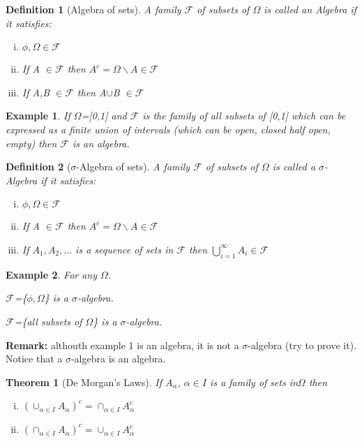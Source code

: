 \documentclass[12pt]{article}
\newtheorem{theorem}{Theorem}
\newtheorem{definition}{Definition}
\newtheorem{example}{Example}
\begin{document}
\begin{definition}[Algebra of sets] A family $\mathcal{F}$ of subsets of $\Omega$ is called an Algebra if it satisfies:
\begin{enumerate}[(i)]
  \item $\phi, \Omega \in \mathcal{F}$
  \item If A $\in \mathcal{F}$ then $A^{c}= \Omega \backslash A \in \mathcal{F}$
  \item If A,B $\in \mathcal{F}$ then A$\cup$B $\in \mathcal{F}$
\end{enumerate}
 \end{definition}

\begin{example} If $\Omega$=[0,1] and $\mathcal{F}$ is the family of all subsets of [0,1] which can be expressed as a finite union of intervals (which can be open, closed half open, empty) then $\mathcal{F}$ is an algebra. \end{example}

\begin{definition}[$\sigma$-Algebra of sets] A family $\mathcal{F}$ of subsets of $\Omega$ is called a $\sigma$-Algebra if it satisfies:
\begin{enumerate}[(i)]
  \item $\phi, \Omega \in \mathcal{F}$
  \item If A $\in \mathcal{F}$ then $A^{c}= \Omega \backslash A \in \mathcal{F}$
  \item If $A_1,A_2,\dots$ is a sequence of sets in $\mathcal{F}$ then $\bigcup_{i=1}^{\infty} A_{i} \in \mathcal{F}$
\end{enumerate}
 \end{definition}

\begin{example}
For any $\Omega$.
\item $\mathcal{F}$=\{$\phi,\Omega$\} is a $\sigma$-algebra.
\item $\mathcal{F}$=\{all subsets of $\Omega$\} is a $\sigma$-algebra.
\end{example}

{\bf Remark:} althouth example 1 is an algebra, it is not a $\sigma$-algebra (try to prove it). Notice that a $\sigma$-algebra is an algebra.
\vspace{20pt}
\begin{theorem}[De Morgan's Laws] If $A_{\alpha}$, $\alpha \in I$ is a family of sets in$\Omega$ then
\begin{enumerate}[(i)]
\item \((\cup_{\alpha \in I}A_{\alpha})^{c}=\cap_{\alpha \in I}A_{\alpha}^{c}\)
\item \((\cap_{\alpha \in I}A_{\alpha})^{c}=\cup_{\alpha \in I}A_{\alpha}^{c}\)
\end{enumerate}
\end{theorem}
\end{document}

